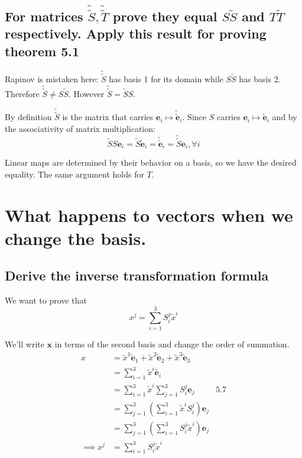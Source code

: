 \documentclass{article}
\newcommand{\nbasis}{\widetilde{\mathbf{e}}_1}
\newcommand{\nbasiss}{\widetilde{\mathbf{e}}_2}
\newcommand{\nbasisss}{\widetilde{\mathbf{e}}_3}
\begin{document}
\subsection{For matrices $\tilde{\tilde{S}}, \tilde{\tilde{T}}$ prove they equal $S\tilde{S}$ and $T\tilde{T}$ respectively. Apply this result for proving theorem 5.1}

 
Rapinov is mistaken here: $\tilde{\tilde{S}}$ has basis 1 for its domain while $S \tilde{S}$ has basis 2. Therefore $\tilde{\tilde{S}} \neq S \tilde{S}$. However $\tilde{\tilde{S}} = \tilde{S}S. $

By definition $\tilde{\tilde{S}}$ is the matrix that carries $\mathbf{e}_i \mapsto \tilde{\tilde{\mathbf{e}}}_i$. Since $S$ carries $\mathbf{e}_i \mapsto \tilde{\mathbf{e}}_i$ and by the associativity of matrix multiplication:
$$\tilde{S} S\mathbf{e}_i =  \tilde{S}\tilde{\mathbf{e}}_i = \tilde{\tilde{\mathbf{e}}}_i = \tilde{\tilde{S}}\mathbf{e}_i, \forall i$$

Linear maps are determined by their behavior on a basis, so we have the desired equality. The same argument holds for $T$.

\section{What happens to vectors when we change the basis.}
\subsection{Derive the inverse transformation formula}

We want to prove that 
$$x^j = \sum_{i=1}^3 S_i^j \tilde{x}^i$$

We'll write $\mathbf{x}$ in terms of the second basis and change the order of summation.
\begin{align*}
	x &= \tilde{x}^1 \nbasis + \tilde{x}^2 \nbasiss + \tilde{x}^3 \nbasisss &\\
	&= \sum_{i=1}^3 \tilde{x}^i \tilde{\mathbf{e}_i} &\\
	&= \sum_{i=1}^3 \tilde{x}^i \sum_{j=1}^3 S_i^j \mathbf{e}_j &\text{5.7}\\
	&= \sum_{j=1}^3 \left( \sum_{i=1}^3 \tilde{x}^iS^j_i \right)\mathbf{e}_j &\\
	&= \sum_{j=1}^3 \left( \sum_{i=1}^3 S^j_i \tilde{x}^i \right)\mathbf{e}_j &\\
\implies x^j &= \sum_{i=1}^3 S_i^j \tilde{x}^i &
\end{align*}
\end{document}

